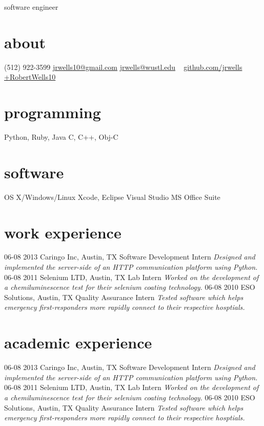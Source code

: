 \documentclass[]{cv}
\begin{document}
       {software engineer}

\begin{aside}
  \section{about}
    (512) 922-3599
    \href{mailto:jrwells10@gmail.com}{jrwells10@gmail.com}
    \href{mailto:jrwells@wustl.edu}{jrwells@wustl.edu}
    ~
    \href{http://github.com/jrwells}{github.com/jrwells}
    \href{http://google.com/+RobertWells10}{+RobertWells10}
  \section{programming}
    Python, Ruby, Java
    C, C++, Obj-C
  \section{software}
    OS X/Windows/Linux
    Xcode, Eclipse
    Visual Studio
    MS Office Suite
\end{aside}

\section{work experience}

\begin{entrylist}
  \entry
    {06-08 2013}
    {Caringo Inc, Austin, TX}
    {Software Development Intern}
    {\emph{Designed and implemented the server-side of an HTTP communication platform using Python.}}
  \entry
    {06-08 2011}
    {Selenium LTD, Austin, TX}
    {Lab Intern}
    {\emph{Worked on the development of a chemiluminescence test for their selenium coating technology.}}
  \entry
    {06-08 2010}
    {ESO Solutions, Austin, TX}
    {Quality Assurance Intern}
    {\emph{Tested software which helps emergency first-responders more rapidly connect to their respective hosptials.}}
\end{entrylist}

\section{academic experience}

\begin{entrylist}
  \entry
    {06-08 2013}
    {Caringo Inc, Austin, TX}
    {Software Development Intern}
    {\emph{Designed and implemented the server-side of an HTTP communication platform using Python.}}
  \entry
    {06-08 2011}
    {Selenium LTD, Austin, TX}
    {Lab Intern}
    {\emph{Worked on the development of a chemiluminescence test for their selenium coating technology.}}
  \entry
    {06-08 2010}
    {ESO Solutions, Austin, TX}
    {Quality Assurance Intern}
    {\emph{Tested software which helps emergency first-responders more rapidly connect to their respective hosptials.}}
\end{entrylist}
\end{document}

